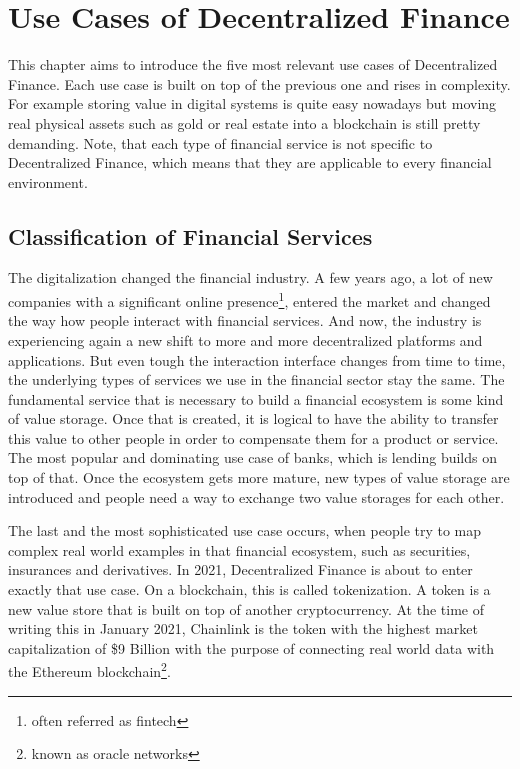 \chapter{Use Cases of Decentralized Finance}
\label{cha:UseCasesDecentralizedFinance}

This chapter aims to introduce the five most relevant use cases of Decentralized Finance. Each use case is built on top of the previous one and rises in complexity. For example storing value in digital systems is quite easy nowadays but moving real physical assets such as gold or real estate into a blockchain is still pretty demanding. Note, that each type of financial service is not specific to Decentralized Finance, which means that they are applicable to every financial environment.

\section{Classification of Financial Services}
The digitalization changed the financial industry. A few years ago, a lot of new companies with a significant online presence\footnote{often referred as fintech}, entered the market and changed the way how people interact with financial services. And now, the industry is experiencing again a new shift to more and more decentralized platforms and applications. But even tough the interaction interface changes from time to time, the underlying types of services we use in the financial sector stay the same. The fundamental service that is necessary to build a financial ecosystem is some kind of value storage. Once that is created, it is logical to have the ability to transfer this value to other people in order to compensate them for a product or service. The most popular and dominating use case of banks, which is lending builds on top of that. Once the ecosystem gets more mature, new types of value storage are introduced and people need a way to exchange two value storages for each other.

The last and the most sophisticated use case occurs, when people try to map complex real world examples in that financial ecosystem, such as securities, insurances and derivatives. In 2021, Decentralized Finance is about to enter exactly that use case. On a blockchain, this is called tokenization. A token is a new value store that is built on top of another cryptocurrency. At the time of writing this in January 2021, Chainlink\cite{Chainlink2021} is the token with the highest market capitalization of \$9 Billion\cite{CoinMarketCap2021} with the purpose of connecting real world data with the Ethereum blockchain\footnote{known as oracle networks}.

